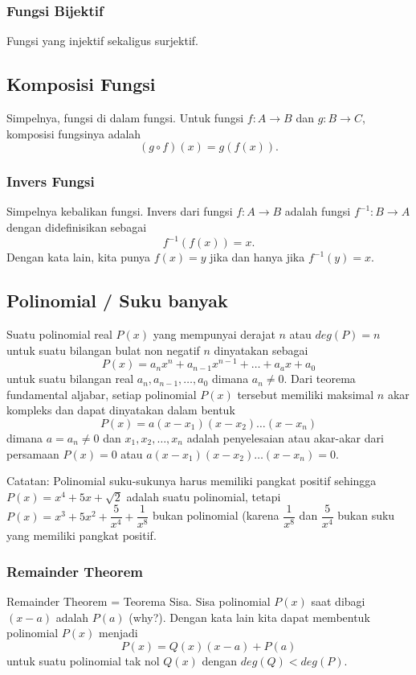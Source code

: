     \subsubsection{Fungsi Bijektif}
    Fungsi yang injektif sekaligus surjektif.
    
    \subsection{Komposisi Fungsi}
    Simpelnya, fungsi di dalam fungsi. Untuk fungsi $f:A \rightarrow B$ dan $g:B \rightarrow C$, komposisi fungsinya adalah
    $$(g \circ f)(x) = g(f(x)).$$
    
    \subsubsection{Invers Fungsi}
    Simpelnya kebalikan fungsi. Invers dari fungsi $f: A \rightarrow B$ adalah fungsi $f^{-1} : B \rightarrow A$ dengan didefinisikan sebagai
    $$f^{-1}(f(x))=x.$$
    Dengan kata lain, kita punya $f(x)=y$ jika dan hanya jika $f^{-1}(y)=x$.
    
    \subsection{Polinomial / Suku banyak}
    Suatu polinomial real $P(x)$ yang mempunyai derajat $n$ atau $deg(P) = n$ untuk suatu bilangan bulat non negatif $n$ dinyatakan sebagai
    $$P(x)=a_nx^n+a_{n-1}x^{n-1}+\dots+a_ax+a_0$$
    untuk suatu bilangan real $a_n,a_{n-1},\dots,a_0$ dimana $a_n \neq 0$. Dari teorema fundamental aljabar, setiap polinomial $P(x)$ tersebut memiliki maksimal $n$ akar kompleks dan dapat dinyatakan dalam bentuk
    $$P(x)=a(x-x_1)(x-x_2)\dots(x-x_n)$$
    dimana $a = a_n \neq 0$ dan $x_1,x_2,\dots,x_n$ adalah penyelesaian atau akar-akar dari persamaan $P(x)=0$ atau $a(x-x_1)(x-x_2)\dots(x-x_n)=0$.
    
    Catatan: Polinomial suku-sukunya harus memiliki pangkat positif sehingga $P(x)=x^4+5x+\sqrt{2}$ adalah suatu polinomial, tetapi $P(x)=x^3+5x^2+\dfrac{5}{x^4}+\dfrac{1}{x^8}$ bukan polinomial (karena $\dfrac{1}{x^8}$ dan $\dfrac{5}{x^4}$ bukan suku yang memiliki pangkat positif.
    
    \subsubsection{Remainder Theorem}
    Remainder Theorem = Teorema Sisa.
    Sisa polinomial $P(x)$ saat dibagi $(x-a)$ adalah $P(a)$ (why?).
    Dengan kata lain kita dapat membentuk polinomial $P(x)$ menjadi
    $$P(x)=Q(x)(x-a)+P(a)$$
    untuk suatu polinomial tak nol $Q(x)$ dengan $deg(Q)<deg(P)$.
    
